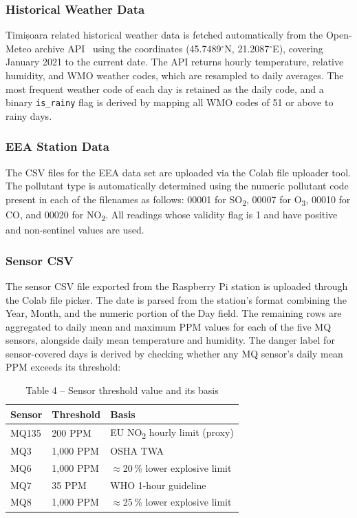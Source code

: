 \subsubsection{Historical Weather Data}

Timișoara related historical weather data is fetched automatically from the Open-Meteo archive
API~\cite{openmeteo} using the coordinates (45.7489$^\circ$N, 21.2087$^\circ$E), covering
January 2021 to the current date. The API returns hourly temperature, relative humidity, and
WMO weather codes, which are resampled to daily averages. The most frequent weather code of
each day is retained as the daily code, and a binary \texttt{is\_rainy} flag is derived by
mapping all WMO codes of 51 or above to rainy days.

\subsubsection{EEA Station Data}

The CSV files for the EEA data set are uploaded via the Colab file uploader tool. The pollutant
type is automatically determined using the numeric pollutant code present in each of the
filenames as follows: 00001 for SO\textsubscript{2}, 00007 for O\textsubscript{3}, 00010 for
CO, and 00020 for NO\textsubscript{2}. All readings whose validity flag is 1 and have positive
and non-sentinel values are used.

\subsubsection{Sensor CSV}

The sensor CSV file exported from the Raspberry Pi station is uploaded through the Colab file
picker. The date is parsed from the station's format combining the Year, Month, and the numeric
portion of the Day field. The remaining rows are aggregated to daily mean and maximum PPM values
for each of the five MQ sensors, alongside daily mean temperature and humidity. The danger label
for sensor-covered days is derived by checking whether any MQ sensor's daily mean PPM exceeds
its threshold:

\vspace{12pt}
\begin{table}[H]
  \centering
  \caption{Table 4 -- Sensor threshold value and its basis}
  \label{tab:ml-thresholds}
  \renewcommand{\arraystretch}{1.3}
  \begin{tabular}{lll}
    \toprule
    \textbf{Sensor} & \textbf{Threshold} & \textbf{Basis} \\
    \midrule
    MQ135 & 200 PPM   & EU NO\textsubscript{2} hourly limit (proxy) \\
    MQ3   & 1{,}000 PPM & OSHA TWA \\
    MQ6   & 1{,}000 PPM & $\approx$20\,\% lower explosive limit \\
    MQ7   & 35 PPM    & WHO 1-hour guideline \\
    MQ8   & 1{,}000 PPM & $\approx$25\,\% lower explosive limit \\
    \bottomrule
  \end{tabular}
\end{table}
\vspace{12pt}

